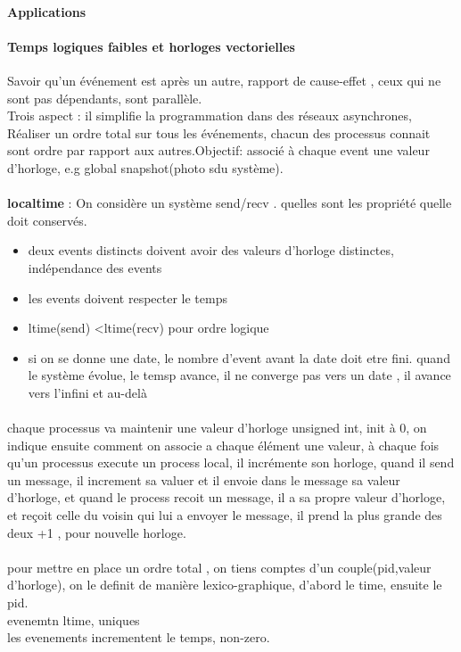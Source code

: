 \documentclass{article}
\begin{document}
\paragraph{Applications}
\paragraph{Temps logiques faibles et horloges vectorielles}
Savoir qu'un événement est après un autre, rapport de cause-effet , ceux qui ne sont pas dépendants, sont parallèle. \\Trois aspect : il simplifie la programmation dans des réseaux asynchrones, Réaliser un ordre total sur tous les événements, chacun des processus connait sont ordre par rapport aux autres.Objectif: associé à chaque event une valeur d'horloge, e.g global snapshot(photo sdu système).\\\\\textbf{localtime} : On considère un système send/recv . quelles sont les propriété quelle doit conservés.
\begin{itemize}
\item deux events distincts doivent avoir des valeurs d'horloge distinctes, indépendance des events
\item les events doivent respecter le temps
\item ltime(send) <ltime(recv) pour ordre logique
\item si on se donne une date, le nombre d'event avant la date doit etre fini. quand le système évolue, le temsp avance, il ne converge pas vers un date , il  avance vers l'infini et au-delà
\end{itemize}

\paragraph{} chaque processus va maintenir une valeur d'horloge unsigned int, init à 0, on indique ensuite comment on associe a chaque élément une valeur, à chaque fois qu'un processus execute un process local, il incrémente son horloge, quand il send un message, il increment sa valuer et il envoie dans le message sa valeur d'horloge, et quand le process  recoit un message, il a sa propre valeur d'horloge, et reçoit celle du voisin qui lui a envoyer le message, il prend la plus grande des deux +1 , pour nouvelle horloge.\\\\pour mettre en place un ordre total , on tiens comptes d'un couple(pid,valeur d'horloge), on le definit de manière lexico-graphique, d'abord le time, ensuite le pid.\\evenemtn ltime, uniques\\les evenements incrementent le temps, non-zero.
\end{document}
